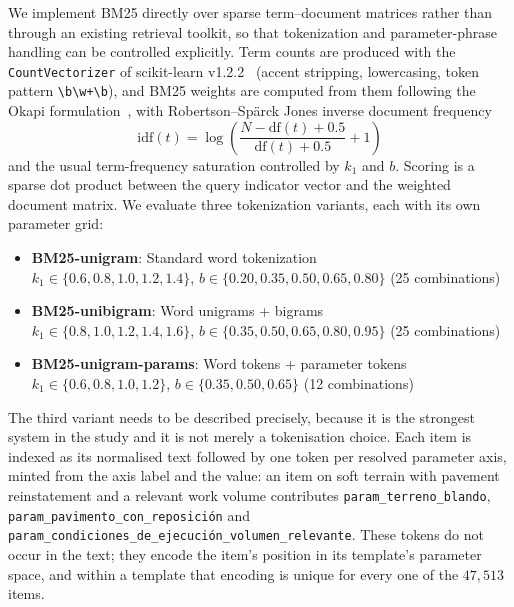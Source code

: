 \documentclass[preprint,12pt]{elsarticle}
\begin{document}
We implement BM25 directly over sparse term--document matrices rather than through an existing retrieval toolkit, so that tokenization and parameter-phrase handling can be controlled explicitly. Term counts are produced with the \texttt{CountVectorizer} of scikit-learn v1.2.2~\citep{pedregosa2011scikit} (accent stripping, lowercasing, token pattern \texttt{\textbackslash b\textbackslash w+\textbackslash b}), and BM25 weights are computed from them following the Okapi formulation~\citep{robertson2009probabilistic}, with Robertson--Sp\"arck Jones inverse document frequency
\begin{equation}
\mathrm{idf}(t) = \log\!\left(\frac{N - \mathrm{df}(t) + 0.5}{\mathrm{df}(t) + 0.5} + 1\right)
\end{equation}
and the usual term-frequency saturation controlled by $k_1$ and $b$. Scoring is a sparse dot product between the query indicator vector and the weighted document matrix. We evaluate three tokenization variants, each with its own parameter grid:
\begin{itemize}
    \item \textbf{BM25-unigram}: Standard word tokenization\\
    $k_1 \in \{0.6, 0.8, 1.0, 1.2, 1.4\}$, $b \in \{0.20, 0.35, 0.50, 0.65, 0.80\}$ (25 combinations)
    \item \textbf{BM25-unibigram}: Word unigrams + bigrams\\
    $k_1 \in \{0.8, 1.0, 1.2, 1.4, 1.6\}$, $b \in \{0.35, 0.50, 0.65, 0.80, 0.95\}$ (25 combinations)
    \item \textbf{BM25-unigram-params}: Word tokens + parameter tokens\\
    $k_1 \in \{0.6, 0.8, 1.0, 1.2\}$, $b \in \{0.35, 0.50, 0.65\}$ (12 combinations)
\end{itemize}

The third variant needs to be described precisely, because it is the strongest system in the study and it is not merely a tokenisation choice. Each item is indexed as its normalised text followed by one token per resolved parameter axis, minted from the axis label and the value: an item on soft terrain with pavement reinstatement and a relevant work volume contributes \texttt{param\_terreno\_blando}, \texttt{param\_pavimento\_con\_reposici\'on} and \texttt{param\_condiciones\_de\_ejecuci\'on\_volumen\_relevante}. These tokens do not occur in the text; they encode the item's position in its template's parameter space, and within a template that encoding is unique for every one of the $47{,}513$ items.
\end{document}
